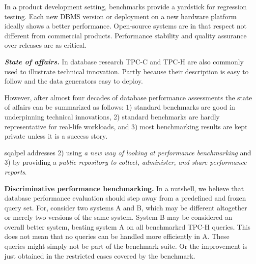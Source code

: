 \documentclass{cidr-2019}
\begin{document}
In a product development setting, benchmarks provide a yardstick for
regression testing. Each new DBMS version or deployment on a new
hardware platform ideally shows a better performance.
Open-source systems are in that respect not different from commercial
products. Performance stability and quality assurance over releases
are as critical.

\emph{\bf State of affairs.} 
In database research TPC-C and TPC-H are also commonly used to illustrate
technical innovation. Partly because their description is easy to
follow and the data generators easy to deploy.

However, after almost four decades of database
performance assessments the state of affairs can be summarized as
follows: 1) standard benchmarks are good in underpinning technical
innovations, 2) standard benchmarks are hardly representative for
real-life workloads\cite{DBLP:conf/sigmod/VogelsgesangHFK18}, and 3)
most benchmarking results are kept private unless it is a success
story.

{\sc sqalpel} addresses 2) using \emph{a new way of looking at
  performance benchmarking} and 3) by providing a \emph{public
  repository to collect, administer, and share performance reports}.


{\bf Discriminative performance benchmarking.}  In a nutshell, we
believe that database performance evaluation should step away from a
predefined and frozen query set. For, consider two systems A and B, which may be
different altogether or merely two versions of the same system. System
B may be considered an overall better system, beating system A on all
benchmarked TPC-H queries. This does not mean that no queries can be
handled more efficiently in A. These queries might simply not be part
of the benchmark suite. Or the improvement is just obtained in the
restricted cases covered by the benchmark.
\end{document}

